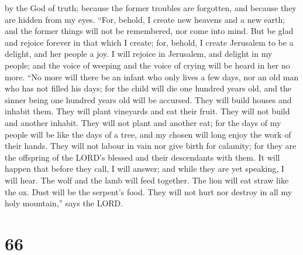 by the God of truth; because the former troubles are forgotten, and
because they are hidden from my eyes.  ``For, behold, I
create new heavens and a new earth; and the former things will not be
remembered, nor come into mind.  But be glad and rejoice
forever in that which I create; for, behold, I create Jerusalem to be a
delight, and her people a joy.  I will rejoice in
Jerusalem, and delight in my people; and the voice of weeping and the
voice of crying will be heard in her no more.  ``No more
will there be an infant who only lives a few days, nor an old man who
has not filled his days; for the child will die one hundred years old,
and the sinner being one hundred years old will be accursed.
 They will build houses and inhabit them. They will plant
vineyards and eat their fruit.  They will not build and
another inhabit. They will not plant and another eat; for the days of my
people will be like the days of a tree, and my chosen will long enjoy
the work of their hands.  They will not labour in vain nor
give birth for calamity; for they are the offspring of the LORD's
blessed and their descendants with them.  It will happen
that before they call, I will answer; and while they are yet speaking, I
will hear.  The wolf and the lamb will feed together. The
lion will eat straw like the ox. Dust will be the serpent's food. They
will not hurt nor destroy in all my holy mountain,'' says the LORD.

\hypertarget{section-63}{%
\section{66}\label{section-63}}

